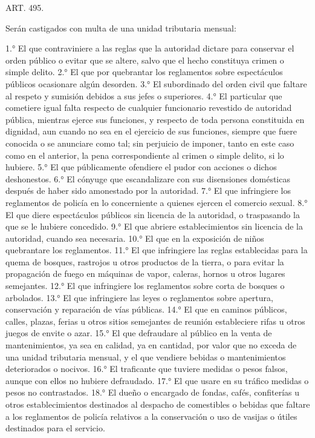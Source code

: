     ART. 495.

    Serán castigados con multa de una unidad tributaria mensual:

    1.° El que contraviniere a las reglas que la autoridad dictare para conservar el orden público o evitar que se altere, salvo que el hecho constituya crimen o simple delito.
    2.° El que por quebrantar los reglamentos sobre espectáculos públicos ocasionare algún desorden.
    3.° El subordinado del orden civil que faltare al respeto y sumisión debidos a sus jefes o superiores.
    4.° El particular que cometiere igual falta respecto de cualquier funcionario revestido de autoridad pública, mientras ejerce sus funciones, y respecto de toda persona constituida en dignidad, aun cuando no sea en el ejercicio de sus funciones, siempre que fuere conocida o se anunciare como tal; sin perjuicio de imponer, tanto en este caso como en el anterior, la pena correspondiente al crimen o simple delito, si lo hubiere.
    5.° El que públicamente ofendiere el pudor con acciones o dichos deshonestos.
    6.° El cónyuge que escandalizare con sus disensiones domésticas después de haber sido amonestado por la autoridad.
    7.° El que infringiere los reglamentos de policía en lo concerniente a quienes ejercen el comercio sexual.
    8.° El que diere espectáculos públicos sin licencia de la autoridad, o traspasando la que se le hubiere concedido.
    9.° El que abriere establecimientos sin licencia de la autoridad, cuando sea necesaria.
    10.° El que en la exposición de niños quebrantare los reglamentos.
    11.° El que infringiere las reglas establecidas para la quema de bosques, rastrojos u otros productos de la tierra, o para evitar la propagación de fuego en máquinas de vapor, caleras, hornos u otros lugares semejantes.
    12.° El que infringiere los reglamentos sobre corta de bosques o arbolados.
    13.° El que infringiere las leyes o reglamentos sobre apertura, conservación y reparación de vías públicas.
    14.° El que en caminos públicos, calles, plazas, ferias u otros sitios semejantes de reunión estableciere rifas u otros juegos de envite o azar.
    15.° El que defraudare al público en la venta de mantenimientos, ya sea en calidad, ya en cantidad, por valor que no exceda de una unidad tributaria mensual, y el que vendiere bebidas o mantenimientos deteriorados o nocivos.
    16.° El traficante que tuviere medidas o pesos falsos, aunque con ellos no hubiere defraudado.
    17.° El que usare en su tráfico medidas o pesos no contrastados.
    18.° El dueño o encargado de fondas, cafés, confiterías u otros establecimientos destinados al despacho de comestibles o bebidas que faltare a los reglamentos de policía relativos a la conservación o uso de vasijas o útiles destinados para el servicio.
